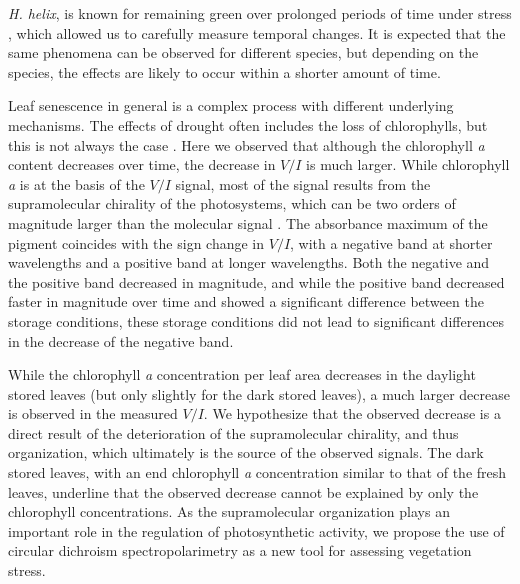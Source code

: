\documentclass[review]{elsarticle}
\begin{document}
\textit{H. helix}, is known for remaining green over prolonged periods of time under stress \cite{Warman1988, Horton1992}, which allowed us to carefully measure temporal changes. It is expected that the same phenomena can be observed for different species, but depending on the species, the effects are likely to occur within a shorter amount of time. 

Leaf senescence in general is a complex process with different underlying mechanisms. The effects of drought often includes the loss of chlorophylls, but this is not always the case \cite{Jaleel2009, Griffiths2014}. Here we observed that although the chlorophyll \textit{a} content decreases over time, the decrease in $V/I$ is much larger. While chlorophyll \textit{a} is at the basis of the $V/I$ signal, most of the signal results from the supramolecular chirality of the photosystems, which can be two orders of magnitude larger than the molecular signal \cite{Garab2009}. The absorbance maximum of the pigment coincides with the sign change in $V/I$, with a negative band at shorter wavelengths and a positive band at longer wavelengths. Both the negative and the positive band decreased in magnitude, and while the positive band decreased faster in magnitude over time and showed a significant difference between the storage conditions, these storage conditions did not lead to significant differences in the decrease of the negative band. 

While the chlorophyll \textit{a} concentration per leaf area decreases in the daylight stored leaves (but only slightly for the dark stored leaves), a much larger decrease is observed in the measured $V/I$. We hypothesize that the observed decrease is a direct result of the deterioration of the supramolecular chirality, and thus organization, which ultimately is the source of the observed signals. The dark stored leaves, with an end chlorophyll \textit{a} concentration similar to that of the fresh leaves, underline that the observed decrease cannot be explained by only the chlorophyll concentrations. As the supramolecular organization plays an important role in the regulation of photosynthetic activity, we propose the use of circular dichroism spectropolarimetry as a new tool for assessing vegetation stress. 
\end{document}
